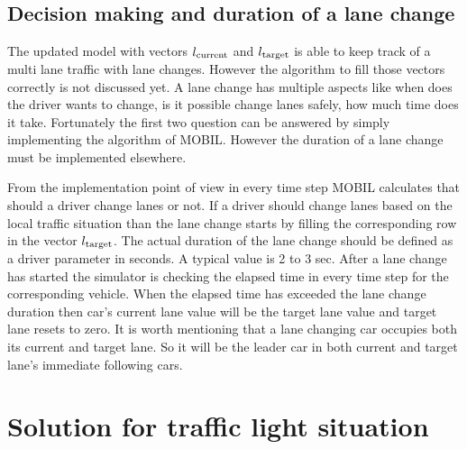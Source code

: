 		\subsection*{Decision making and duration of a lane change}
		The updated model with vectors $l_{\rm current}$ and $l_{\rm target}$ is able to keep track of a multi lane traffic with lane changes. However the algorithm to fill those vectors correctly is not discussed yet. A lane change has multiple aspects like when does the driver wants to change, is it possible change lanes safely, how much time does it take. Fortunately the first two question can be answered by simply implementing the algorithm of MOBIL. However the duration of a lane change must be implemented elsewhere.

		From the implementation point of view in every time step MOBIL calculates that should a driver change lanes or not. If a driver should change lanes based on the local traffic situation than the lane change starts by filling the corresponding row in the vector $l_{\rm target}$. The actual duration of the lane change should be defined as a driver parameter in seconds. A typical value is 2 to 3 sec. After a lane change has started the simulator is checking the elapsed time in every time step for the corresponding vehicle. When the elapsed time has exceeded the lane change duration then car's current lane value will be the target lane value and target lane resets to zero. It is worth mentioning that a lane changing car occupies both its current and target lane. So it will be the leader car in both current and target lane's immediate following cars.
	\section{Solution for traffic light situation}
